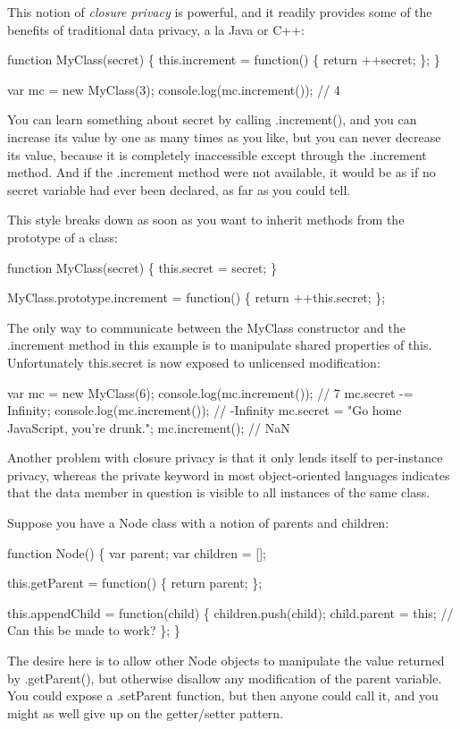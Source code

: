 This notion of {\itshape closure privacy} is powerful, and it readily provides some of the benefits of traditional data privacy, a la Java or C++\+: 
\begin{DoxyCode}
function MyClass(secret) \{
    this.increment = function() \{
        return ++secret;
    \};
\}

var mc = new MyClass(3);
console.log(mc.increment()); // 4
\end{DoxyCode}
 You can learn something about {\ttfamily secret} by calling {\ttfamily .increment()}, and you can increase its value by one as many times as you like, but you can never decrease its value, because it is completely inaccessible except through the {\ttfamily .increment} method. And if the {\ttfamily .increment} method were not available, it would be as if no {\ttfamily secret} variable had ever been declared, as far as you could tell.

This style breaks down as soon as you want to inherit methods from the prototype of a class\+: 
\begin{DoxyCode}
function MyClass(secret) \{
    this.secret = secret;
\}

MyClass.prototype.increment = function() \{
    return ++this.secret;
\};
\end{DoxyCode}
 The only way to communicate between the {\ttfamily My\+Class} constructor and the {\ttfamily .increment} method in this example is to manipulate shared properties of {\ttfamily this}. Unfortunately {\ttfamily this.\+secret} is now exposed to unlicensed modification\+: 
\begin{DoxyCode}
var mc = new MyClass(6);
console.log(mc.increment()); // 7
mc.secret -= Infinity;
console.log(mc.increment()); // -Infinity
mc.secret = "Go home JavaScript, you're drunk.";
mc.increment(); // NaN
\end{DoxyCode}
 Another problem with closure privacy is that it only lends itself to per-\/instance privacy, whereas the {\ttfamily private} keyword in most object-\/oriented languages indicates that the data member in question is visible to all instances of the same class.

Suppose you have a {\ttfamily Node} class with a notion of parents and children\+: 
\begin{DoxyCode}
function Node() \{
    var parent;
    var children = [];

    this.getParent = function() \{
        return parent;
    \};

    this.appendChild = function(child) \{
        children.push(child);
        child.parent = this; // Can this be made to work?
    \};
\}
\end{DoxyCode}
 The desire here is to allow other {\ttfamily Node} objects to manipulate the value returned by {\ttfamily .get\+Parent()}, but otherwise disallow any modification of the {\ttfamily parent} variable. You could expose a {\ttfamily .set\+Parent} function, but then anyone could call it, and you might as well give up on the getter/setter pattern.

